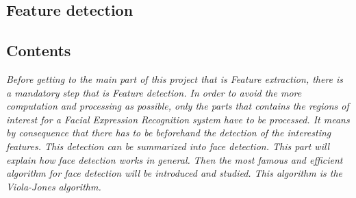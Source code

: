   \begin{titlepage}
    \vspace*{\fill}
      \part{Feature detection}
    \vspace*{\fill}
  \end{titlepage}
  
\startcontents[parts]

\chapter*{Contents}

\textit{Before getting to the main part of this project that is Feature extraction, there is a mandatory step that is Feature detection. In order to avoid the more computation and processing as possible, only the parts that contains the regions of interest for a Facial Expression Recognition system have to be processed. It means by consequence that there has to be beforehand the detection of the interesting features. This detection can be summarized into face detection. This part will explain how face detection works in general. Then the most famous and efficient algorithm for face detection will be introduced and studied. This algorithm is the Viola-Jones algorithm.}

\vspace{\baselineskip}


\pagebreak


\newpage


\stopcontents[parts]

